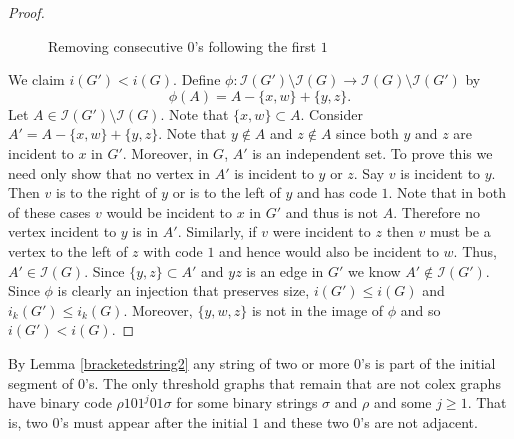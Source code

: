 \documentclass[12pt]{amsart}
\theoremstyle{plain}
\theoremstyle{definition}
\begin{document}
\begin{proof}
\begin{figure}[!ht]
\begin{center}
\caption{Removing consecutive $0$'s following the first $1$}
\label{fig:Bracketed0String2}
\end{center}
\end{figure}

We claim $i(G')< i(G)$.  Define $\phi: \mathcal{I}(G') \setminus \mathcal{I}(G) \to \mathcal{I}(G) \setminus \mathcal{I}(G')$ by 
\[\phi (A)  = A - \{x,w\} + \{y,z\}.\]  
Let $A\in\mathcal{I}(G') \setminus \mathcal{I}(G)$.  Note that $\{x,w\}\subset A$.  Consider $A' = A - \{x,w\} + \{y,z\}$.  Note that $y\notin A$ and $z\notin A$ since both $y$ and $z$ are incident to $x$ in $G'$.  Moreover, in $G$, $A'$ is an independent set.  To prove this we need only show that no vertex in $A'$ is incident to $y$ or $z$.  Say $v$ is incident to $y$. Then $v$ is to the right of $y$ or is to the left of $y$ and has code $1$.  Note that in both of these cases $v$ would be incident to $x$ in $G'$ and thus is not $A$.  Therefore no vertex incident to $y$ is in $A'$.  Similarly, if $v$ were incident to $z$ then $v$ must be a vertex to the left of $z$ with code $1$ and hence would also be incident to $w$.  Thus, $A' \in \mathcal{I}(G)$. Since $\{y,z\}\subset A'$ and $yz$ is an edge in $G'$ we know $A'\notin \mathcal{I}(G')$.  Since $\phi$ is clearly an injection that preserves size, $i(G') \leq i(G)$ and $i_k(G') \leq i_k(G)$.  Moreover, $\{y,w,z\}$ is not in the image of $\phi$ and so $i(G') <i(G)$.
\end{proof}




By Lemma \ref{bracketedstring2} any string of two or more $0$'s is part of the initial segment of $0$'s.  The only threshold graphs that remain that are not colex graphs have binary code $\rho101^j01\sigma$ for some binary strings $\sigma$ and $\rho$ and some $j\geq 1$. That is, two $0$'s must appear after the initial $1$ and these two $0$'s are not adjacent.
\end{document}
